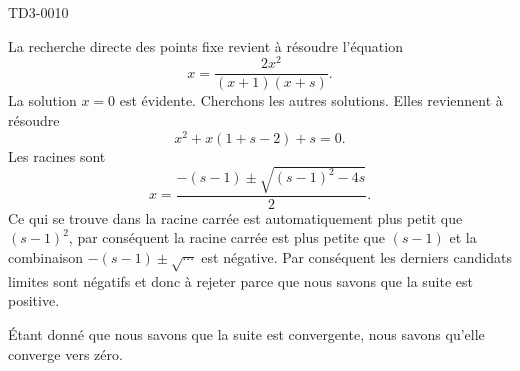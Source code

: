 \begin{corrige}{TD3-0010}
\begin{enumerate}
\begin{enumerate}
                La recherche directe des points fixe revient à résoudre l'équation
                \begin{equation}
                    x=\frac{ 2x^2 }{ (x+1)(x+s) }.
                \end{equation}
                La solution \( x=0\) est évidente. Cherchons les autres solutions. Elles reviennent à résoudre
                \begin{equation}
                    x^2+x(1+s-2)+s=0.
                \end{equation}
                Les racines sont
                \begin{equation}
                    x=\frac{ -(s-1)\pm\sqrt{ (s-1)^2-4s   } }{ 2 }.
                \end{equation}
                Ce qui se trouve dans la racine carrée est automatiquement plus petit que \( (s-1)^2\), par conséquent la racine carrée est plus petite que \( (s-1)\) et la combinaison \( -(s-1)\pm\sqrt{\cdots}\) est négative. Par conséquent les derniers candidats limites sont négatifs et donc à rejeter parce que nous savons que la suite est positive.

        \end{enumerate}
        Étant donné que nous savons que la suite est convergente, nous savons qu'elle converge vers zéro.

  \end{enumerate}

\end{corrige}
